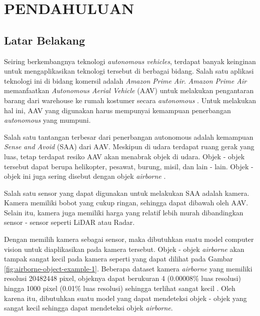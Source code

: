 \chapter{PENDAHULUAN}
\section{Latar Belakang}
    Seiring berkembangnya teknologi \emph{autonomous vehicles}, terdapat banyak keinginan untuk mengaplikasikan teknologi tersebut di berbagai bidang.
    Salah satu aplikasi teknologi ini di bidang komersil adalah \emph{Amazon Prime Air}.
    \emph{Amazon Prime Air} memanfaatkan \emph{Autonomous Aerial Vehicle} (AAV) untuk melakukan pengantaran barang dari warehouse ke rumah kostumer secara \emph{autonomous} \parencite{prime_air}.
    Untuk melakukan hal ini, AAV yang digunakan harus mempunyai kemampuan penerbangan \emph{autonomous} yang mumpuni.

    Salah satu tantangan terbesar dari penerbangan autonomous adalah kemampuan \emph{Sense and Avoid} (SAA) dari AAV.
    Meskipun di udara terdapat ruang gerak yang luas, tetap terdapat resiko AAV akan menabrak objek di udara.
    Objek - objek tersebut dapat berupa helikopter, pesawat, burung, misil, dan lain - lain.
    Objek - objek ini juga sering disebut dengan objek \emph{airborne} \parencite{aot_docs}.

    Salah satu sensor yang dapat digunakan untuk melakukan SAA adalah kamera.
    Kamera memiliki bobot yang cukup ringan, sehingga dapat dibawah oleh AAV.
    Selain itu, kamera juga memiliki harga yang relatif lebih murah dibandingkan sensor - sensor seperti LiDAR atau Radar.

    Dengan memilih kamera sebagai sensor, maka dibutuhkan suatu model computer vision untuk diaplikasikan pada kamera tersebut.
    Objek - objek \emph{airborne} akan tampak sangat kecil pada kamera seperti yang dapat dilihat pada Gambar \ref{fig:airborne-object-example-1}.
    Beberapa dataset kamera \emph{airborne} yang memiliki resolusi 20482448 pixel, objeknya dapat berukuran 4 (0.00008\% luas resolusi) hingga 1000 pixel (0.01\% luas resolusi) sehingga terlihat sangat kecil \parencite{aot_dataset}.
    Oleh karena itu, dibutuhkan suatu model yang dapat mendeteksi objek - objek yang sangat kecil sehingga dapat mendeteksi objek \emph{airborne}.

